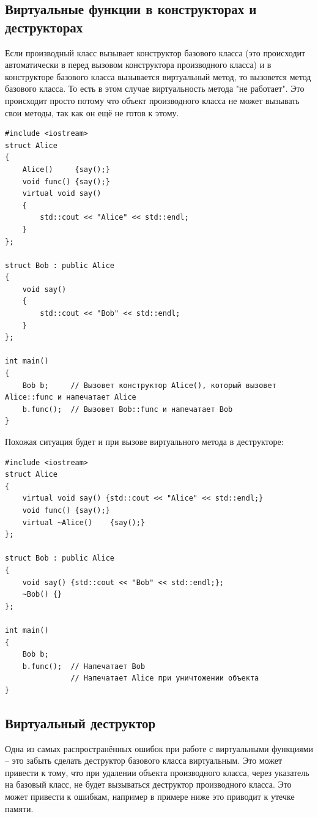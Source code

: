 \documentclass{article}
\begin{document}
\subsection*{Виртуальные функции в конструкторах и деструкторах}
Если производный класс вызывает конструктор базового класса (это происходит автоматически в перед вызовом конструктора производного класса) и в конструкторе базового класса вызывается виртуальный метод, то вызовется метод базового класса. То есть в этом случае виртуальность метода "не работает".
Это происходит просто потому что объект производного класса не может вызывать свои методы, так как он ещё не готов к этому. 
\begin{lstlisting}[style=csMiptCppBorderStyle]
#include <iostream>
struct Alice 
{
    Alice()     {say();}
    void func() {say();}
    virtual void say() 
    {
    	std::cout << "Alice" << std::endl;
    }
};

struct Bob : public Alice 
{
    void say() 
    {
    	std::cout << "Bob" << std::endl;
    }
};

int main() 
{
    Bob b;     // Вызовет конструктор Alice(), который вызовет Alice::func и напечатает Alice
    b.func();  // Вызовет Bob::func и напечатает Bob
}
\end{lstlisting}
Похожая ситуация будет и при вызове виртуального метода в деструкторе:
\begin{lstlisting}[style=csMiptCppBorderStyle]
#include <iostream>
struct Alice 
{
    virtual void say() {std::cout << "Alice" << std::endl;}
    void func() {say();}
    virtual ~Alice()    {say();}
};

struct Bob : public Alice 
{
    void say() {std::cout << "Bob" << std::endl;};
    ~Bob() {}
};

int main() 
{
    Bob b;
    b.func();  // Напечатает Bob
               // Напечатает Alice при уничтожении объекта
}
\end{lstlisting}



\subsection*{Виртуальный деструктор}
Одна из самых распространённых ошибок при работе с виртуальными функциями -- это забыть сделать деструктор базового класса виртуальным. Это может привести к тому, что при удалении объекта производного класса, через указатель на базовый класс, не будет вызываться деструктор производного класса. Это может привести к ошибкам, например в примере ниже это приводит к утечке памяти.
\end{document}
